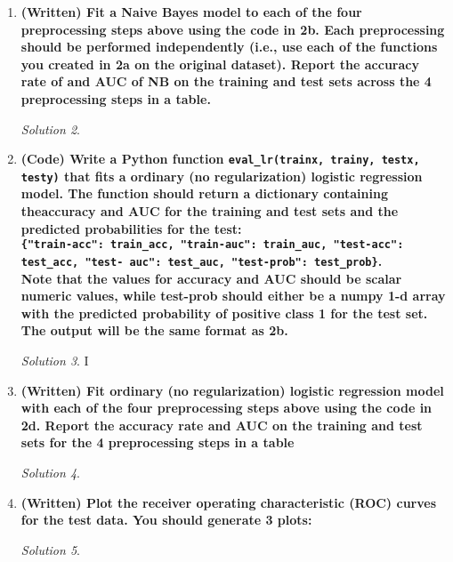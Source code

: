 \documentclass[a4paper,12pt]{article}
\theoremstyle{definition}
\theoremstyle{remark}
\newtheorem*{solution}{Solution}
\begin{document}
\begin{enumerate}
\begin{enumerate}
\begin{solution}
			\end{solution}
			\item {\bf (Written) Fit a Naive Bayes model to each of the four preprocessing steps above using the code in 2b. Each preprocessing should be performed independently (i.e., use each of the functions you created in 2a on the original dataset). Report the accuracy rate of and AUC of NB on the training and test sets across the 4 preprocessing steps in a table.}	
			\begin{solution}
				
			\end{solution}
			\item {\bf(Code) Write a Python function \texttt{eval\_lr(trainx, trainy, testx, testy)} that fits a ordinary (no regularization) logistic regression model. The function should return a dictionary containing theaccuracy and AUC for the training and test sets and the predicted probabilities for the test: \\
				
				\texttt{\{"train-acc": train\_acc, "train-auc": train\_auc, "test-acc": test\_acc, "test-
					auc": test\_auc, "test-prob": test\_prob\}}.\\
				 Note that the values for accuracy and AUC should be scalar numeric values, while test-prob should either be a numpy 1-d array with the predicted probability of positive class 1 for the test set. The output will be the same format as 2b.}
			\begin{solution}
				I
			\end{solution}
			\item {\bf(Written) Fit ordinary (no regularization) logistic regression model with each of the four preprocessing steps above using the code in 2d. Report the accuracy rate and AUC on the training and test sets for the 4 preprocessing steps in a table}
			\begin{solution}
				
				
			\end{solution}
			\item {\bf(Written) Plot the receiver operating characteristic (ROC) curves for the test data. You should generate 3 plots:}
			\begin{solution}
			

\end{solution}
\end{enumerate}
\end{enumerate}
\end{document}
